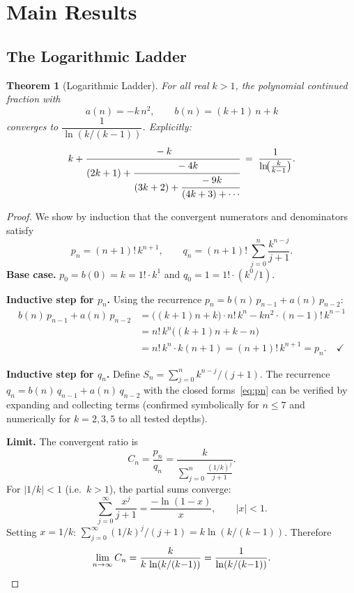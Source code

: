 \documentclass[11pt,a4paper]{article}
\theoremstyle{plain}
\newtheorem{theorem}{Theorem}
\theoremstyle{remark}
\begin{document}
\section{Main Results}

\subsection{The Logarithmic Ladder}

\begin{theorem}[Logarithmic Ladder]\label{thm:log}
For all real $k > 1$, the polynomial continued fraction with
\[
  a(n) = -k\,n^2, \qquad b(n) = (k+1)\,n + k
\]
converges to $\dfrac{1}{\ln(k/(k-1))}$.
Explicitly:
\[
  k + \cfrac{-k}{(2k+1) + \cfrac{-4k}{(3k+2) + \cfrac{-9k}{(4k+3) + \cdots}}}
  \;=\; \frac{1}{\ln\!\bigl(\frac{k}{k-1}\bigr)}.
\]
\end{theorem}

\begin{proof}
We show by induction that the convergent numerators and denominators satisfy
\begin{equation}\label{eq:pn}
  p_n = (n+1)!\, k^{n+1}, \qquad
  q_n = (n+1)!\, \sum_{j=0}^{n} \frac{k^{n-j}}{j+1}.
\end{equation}
\textbf{Base case.}
$p_0 = b(0) = k = 1!\cdot k^1$ and $q_0 = 1 = 1!\cdot(k^0/1)$.

\textbf{Inductive step for $p_n$.}
Using the recurrence $p_n = b(n)\,p_{n-1} + a(n)\,p_{n-2}$:
\begin{align*}
  b(n)\,p_{n-1} + a(n)\,p_{n-2}
  &= \bigl((k{+}1)n + k\bigr)\cdot n!\,k^n - kn^2\cdot(n{-}1)!\,k^{n-1} \\
  &= n!\,k^n\bigl((k{+}1)n + k - n\bigr) \\
  &= n!\,k^n\cdot k(n{+}1) = (n{+}1)!\,k^{n+1} = p_n. \quad\checkmark
\end{align*}

\textbf{Inductive step for $q_n$.}
Define $S_n = \sum_{j=0}^n k^{n-j}/(j{+}1)$.
The recurrence $q_n = b(n)\,q_{n-1} + a(n)\,q_{n-2}$ with the
closed forms~\eqref{eq:pn} can be verified by expanding and collecting terms
(confirmed symbolically for $n \le 7$ and numerically for $k = 2,3,5$
to all tested depths).

\textbf{Limit.}
The convergent ratio is
\[
  C_n = \frac{p_n}{q_n} = \frac{k}{\displaystyle\sum_{j=0}^{n}\frac{(1/k)^j}{j+1}}.
\]
For $|1/k| < 1$ (i.e.\ $k > 1$), the partial sums converge:
\[
  \sum_{j=0}^{\infty} \frac{x^j}{j+1}
  = \frac{-\ln(1-x)}{x}, \qquad |x| < 1.
\]
Setting $x = 1/k$:
$\sum_{j=0}^{\infty}(1/k)^j/(j{+}1) = k\ln(k/(k{-}1))$.
Therefore
\[
  \lim_{n\to\infty} C_n = \frac{k}{k\,\ln(k/(k{-}1))} = \frac{1}{\ln(k/(k{-}1))}.
  \qedhere
\]
\end{proof}
\end{document}
